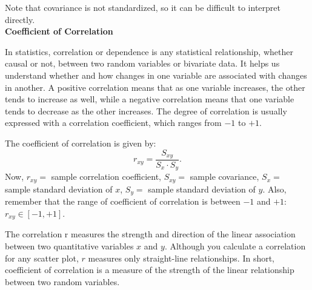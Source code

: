 Note that covariance is not standardized, so it can be difficult to interpret directly.\\

\textbf{Coefficient of Correlation}

In statistics, correlation or dependence is any statistical relationship, whether causal or not, between two random variables or bivariate data. It helps us understand whether and how changes in one variable are associated with changes in another. A positive correlation means that as one variable increases, the other tends to increase as well, while a negative correlation means that one variable tends to decrease as the other increases. The degree of correlation is usually expressed with a correlation coefficient, which ranges from $-1$ to $+1$.

\begin{definition}
The coefficient of correlation is given by: \[ r_{xy} = \frac{S_{xy}}{S_x \cdot S_y}.\]
Now, $r_{xy} = $ sample correlation coefficient, $S_{xy} = $ sample covariance, $S_{x} = $ sample standard deviation of $x$, $S_{y} = $ sample standard deviation of $y$. Also, remember that the range of coefficient of correlation is between $-1$ and $+1$: $r_{xy} \in [-1, +1]$.
\end{definition}

The correlation r measures the strength and direction of the linear association between two quantitative variables $x$ and $y$. Although you calculate a correlation for any scatter plot, $r$ measures only straight-line relationships. In short, coefficient of correlation is a measure of the strength of the linear relationship between two random variables.

